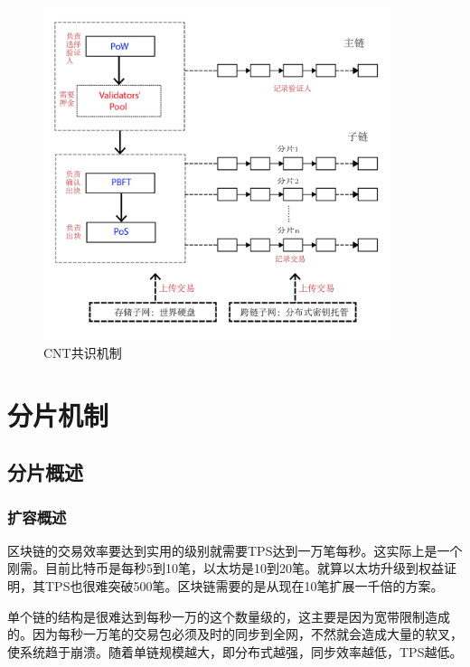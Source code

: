 \documentclass[a4paper,12pt]{article}
\begin{document}
\begin {figure} [htbp]
\centering \includegraphics [width = 4in] {pic_cn/consensus.png}
\caption {CNT共识机制} \label {fig: consensus}
\end {figure}






\section{分片机制}
\subsection{分片概述}
\subsubsection{扩容概述}

区块链的交易效率要达到实用的级别就需要TPS达到一万笔每秒。这实际上是一个刚需。目前比特币是每秒5到10笔，以太坊是10到20笔。就算以太坊升级到权益证明，其TPS也很难突破500笔。区块链需要的是从现在10笔扩展一千倍的方案。

单个链的结构是很难达到每秒一万的这个数量级的，这主要是因为宽带限制造成的。因为每秒一万笔的交易包必须及时的同步到全网，不然就会造成大量的软叉，使系统趋于崩溃。随着单链规模越大，即分布式越强，同步效率越低，TPS越低。
\end{document}
